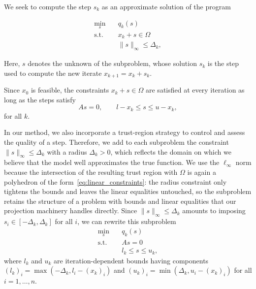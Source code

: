 \documentclass{article}
\numberwithin{equation}{section}
\theoremstyle{plain}
\begin{document}
	We seek to compute the step $s_k$ as an approximate solution of the program
	
	\begin{align*}
		\min_{s} \quad& q_k(s)  \\
		\text{s.t.}  \quad & x_k+s \in \Omega \\ 
		& \|s\|_\infty \le \Delta_k,
	\end{align*}	
	
	Here, $s$ denotes the unknown of the subproblem, whose solution $s_k$ is the step used to compute the new iterate $x_{k+1}=x_k+s_k$.
	
	Since $x_0$ is feasible, the constraints $x_k+s\in \Omega$ are satisfied at every iteration as long as the steps satisfy
	\[As = 0, \qquad l - x_k \le s \le u-x_k,\]
	for all $k$.
	
	In our method, we also incorporate a trust-region strategy to control and assess the quality of a step. Therefore, we add to each subproblem the constraint $\|s\|_\infty \le \Delta_k$ with a radius $\Delta_k > 0$, which reflects the domain on which we believe that the model well approximates the true function. We use the $\ell_\infty$ norm because the intersection of the resulting trust region with $\Omega$ is again a polyhedron of the form~\eqref{eq:linear_constraints}: the radius constraint only tightens the bounds and leaves the linear equalities untouched, so the subproblem retains the structure of a problem with bounds and linear equalities that our projection machinery handles directly. Since $\|s\|_\infty \le \Delta_k$ amounts to imposing $s_i \in [-\Delta_k,\Delta_k]$ for all $i$, we can rewrite this subproblem	
	\begin{subequations}\label{pb:quadratic_subproblem} 
		\begin{align}
			\min_{s} \quad& q_k(s)  \\
			\text{s.t.}  \quad & As=0 \\
			& l_k \le s \le u_k,
		\end{align}	
	\end{subequations}
	where $l_k$ and $u_k$ are iteration-dependent bounds having components $(l_k)_i = \max\left(-\Delta_k,l_i-(x_k)_i\right)$ and $(u_k)_i = \min\left(\Delta_k,u_i-(x_k)_i\right)$ for all $i=1,\ldots,n$.
	
\end{document}
